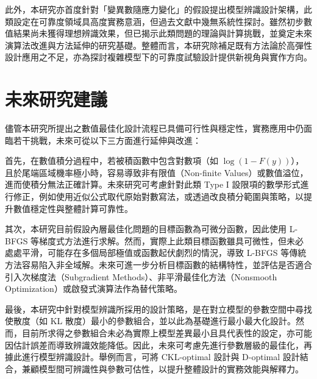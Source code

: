 \hspace*{8mm} 此外，本研究亦首度針對「變異數隨應力變化」的假設提出模型辨識設計架構，此類設定在可靠度領域具高度實務意涵，但過去文獻中幾無系統性探討。雖然初步數值結果尚未獲得理想辨識效果，但已揭示此類問題的理論與計算挑戰，並奠定未來演算法改進與方法延伸的研究基礎。整體而言，本研究除補足既有方法論於高彈性設計應用之不足，亦為探討複雜模型下的可靠度試驗設計提供新視角與實作方向。

\section{未來研究建議}

\hspace*{8mm} 儘管本研究所提出之數值最佳化設計流程已具備可行性與穩定性，實務應用中仍面臨若干挑戰，未來可從以下三方面進行延伸與改進：

\hspace*{8mm} 首先，在數值積分過程中，若被積函數中包含對數項（如 $\log(1 - F(y))$），且於尾端區域機率極小時，容易導致非有限值（Non-finite Values）或數值溢位，進而使積分無法正確計算。未來研究可考慮針對此類 Type I 設限項的數學形式進行修正，例如使用近似公式取代原始對數寫法，或透過改良積分範圍與策略，以提升數值穩定性與整體計算可靠性。

\hspace*{8mm} 其次，本研究目前假設內層最佳化問題的目標函數為可微分函數，因此使用 L-BFGS 等梯度式方法進行求解。然而，實際上此類目標函數雖具可微性，但未必處處平滑，可能存在多個局部極值或函數起伏劇烈的情況，導致 L-BFGS 等傳統方法容易陷入非全域解。未來可進一步分析目標函數的結構特性，並評估是否適合引入次梯度法（Subgradient Methods）、非平滑最佳化方法（Nonsmooth Optimization）或啟發式演算法作為替代策略。

\hspace*{8mm} 最後，本研究中針對模型辨識所採用的設計策略，是在對立模型的參數空間中尋找使散度（如 KL 散度）最小的參數組合，並以此為基礎進行最小最大化設計。然而，目前所求得之參數組合未必為實際上模型差異最小且具代表性的設定，亦可能因估計誤差而導致辨識效能降低。因此，未來可考慮先進行參數層級的最佳化，再據此進行模型辨識設計。舉例而言，可將 CKL-optimal 設計與 D-optimal 設計結合，兼顧模型間可辨識性與參數可估性，以提升整體設計的實務效能與解釋力。
